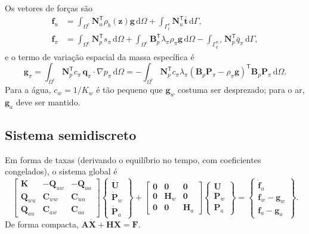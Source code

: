 \documentclass[11pt,a4paper]{article}
\numberwithin{equation}{section}
\newcommand{\dd}{\mathrm{d}}
\begin{document}
Os vetores de forças são
\begin{align}
\mathbf f_u&=\int_{\Omega^e}\mathbf N_u^{\mathsf T}\rho_b(\mathbf z)\mathbf g\,\dd\Omega
+\int_{\Gamma_t^e}\mathbf N_u^{\mathsf T}\bar{\mathbf t}\,\dd\Gamma,\\
\mathbf f_\pi&=\int_{\Omega^e}\mathbf N_p^{\mathsf T}s_\pi\,\dd\Omega
+\int_{\Omega^e}\mathbf B_p^{\mathsf T}\lambda_\pi\rho_\pi\mathbf g\,\dd\Omega
-\int_{\Gamma_q^{\pi,e}}\mathbf N_p^{\mathsf T}\bar q_\pi\,\dd\Gamma,
\end{align}
e o termo de variação espacial da massa específica é
\begin{equation}
\mathbf g_\pi=\int_{\Omega^e}\mathbf N_p^{\mathsf T}c_\pi\,\mathbf q_\pi\cdot\nabla p_\pi\,\dd\Omega
=-\int_{\Omega^e}\mathbf N_p^{\mathsf T}c_\pi\lambda_\pi
(\mathbf B_p\mathbf P_\pi-\rho_\pi\mathbf g)^{\mathsf T}\mathbf B_p\mathbf P_\pi\,\dd\Omega .
\end{equation}
Para a água, $c_w=1/K_w$ é tão pequeno que $\mathbf g_w$ costuma ser
desprezado; para o ar, $\mathbf g_a$ deve ser mantido.

\subsection{Sistema semidiscreto}

Em forma de taxas (derivando o equilíbrio no tempo, com coeficientes
congelados), o sistema global é
\begin{equation}
\boxed{
\begin{bmatrix}\mathbf K&-\mathbf Q_{uw}&-\mathbf Q_{ua}\\
\mathbf Q_{wu}&\mathbf C_{ww}&\mathbf C_{wa}\\
\mathbf Q_{au}&\mathbf C_{aw}&\mathbf C_{aa}\end{bmatrix}
\begin{Bmatrix}\dot{\mathbf U}\\ \dot{\mathbf P}_w\\ \dot{\mathbf P}_a\end{Bmatrix}
+\begin{bmatrix}\mathbf 0&\mathbf 0&\mathbf 0\\ \mathbf 0&\mathbf H_w&\mathbf 0\\ \mathbf 0&\mathbf 0&\mathbf H_a\end{bmatrix}
\begin{Bmatrix}\mathbf U\\ \mathbf P_w\\ \mathbf P_a\end{Bmatrix}
=\begin{Bmatrix}\dot{\mathbf f}_u\\ \mathbf f_w-\mathbf g_w\\ \mathbf f_a-\mathbf g_a\end{Bmatrix}.}
\end{equation}
De forma compacta, $\mathbf A\dot{\mathbf X}+\mathbf H\mathbf X=\mathbf F$.
\end{document}
